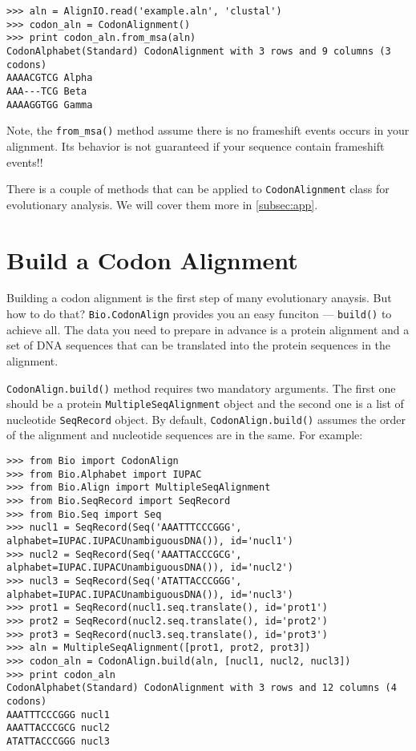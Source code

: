 \begin{verbatim}
>>> aln = AlignIO.read('example.aln', 'clustal')
>>> codon_aln = CodonAlignment()
>>> print codon_aln.from_msa(aln)
CodonAlphabet(Standard) CodonAlignment with 3 rows and 9 columns (3 codons)
AAAACGTCG Alpha
AAA---TCG Beta
AAAAGGTGG Gamma
\end{verbatim}

Note, the \verb|from_msa()| method assume there is no frameshift
events occurs in your alignment. Its behavior is not guaranteed if your
sequence contain frameshift events!!

There is a couple of methods that can be applied to
\verb|CodonAlignment| class for evolutionary analysis. We will cover
them more in \ref{subsec:app}.

\section{Build a Codon Alignment}

Building a codon alignment is the first step of many evolutionary
anaysis. But how to do that? \verb|Bio.CodonAlign| provides you an
easy funciton --- \verb|build()| to achieve all. The data you need to
prepare in advance is a protein alignment and a set of DNA sequences
that can be translated into the protein sequences in the alignment.

\verb|CodonAlign.build()| method requires two mandatory arguments. The
first one should be a protein \verb|MultipleSeqAlignment| object and
the second one is a list of nucleotide \verb|SeqRecord| object. By
default, \verb|CodonAlign.build()| assumes the order of the alignment
and nucleotide sequences are in the same. For example:

\begin{verbatim}
>>> from Bio import CodonAlign
>>> from Bio.Alphabet import IUPAC
>>> from Bio.Align import MultipleSeqAlignment
>>> from Bio.SeqRecord import SeqRecord
>>> from Bio.Seq import Seq
>>> nucl1 = SeqRecord(Seq('AAATTTCCCGGG', alphabet=IUPAC.IUPACUnambiguousDNA()), id='nucl1')
>>> nucl2 = SeqRecord(Seq('AAATTACCCGCG', alphabet=IUPAC.IUPACUnambiguousDNA()), id='nucl2')
>>> nucl3 = SeqRecord(Seq('ATATTACCCGGG', alphabet=IUPAC.IUPACUnambiguousDNA()), id='nucl3')
>>> prot1 = SeqRecord(nucl1.seq.translate(), id='prot1')
>>> prot2 = SeqRecord(nucl2.seq.translate(), id='prot2')
>>> prot3 = SeqRecord(nucl3.seq.translate(), id='prot3')
>>> aln = MultipleSeqAlignment([prot1, prot2, prot3])
>>> codon_aln = CodonAlign.build(aln, [nucl1, nucl2, nucl3])
>>> print codon_aln
CodonAlphabet(Standard) CodonAlignment with 3 rows and 12 columns (4 codons)
AAATTTCCCGGG nucl1
AAATTACCCGCG nucl2
ATATTACCCGGG nucl3
\end{verbatim}


